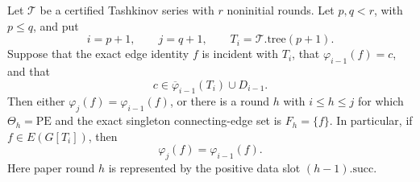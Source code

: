 \begin{lemma}
Let \(\mathcal T\) be a certified Tashkinov series with \(r\)
noninitial rounds.  Let \(p,q<r\), with \(p\leq q\), and put
\[
 i=p+1,\qquad j=q+1,\qquad T_i=\mathcal T.\mathrm{tree}(p+1).
\]
Suppose that the exact edge identity \(f\) is incident with \(T_i\),
that \(\varphi_{i-1}(f)=c\), and that
\[
 c\in\overline\varphi_{i-1}(T_i)\cup D_{i-1}.
\]
Then either \(\varphi_j(f)=\varphi_{i-1}(f)\), or there is a round
\(h\) with \(i\leq h\leq j\) for which
\(\Theta_h=\mathrm{PE}\) and the exact singleton connecting-edge set is
\(F_h=\{f\}\).  In particular, if
\(f\in E(G[T_i])\), then
\[
 \varphi_j(f)=\varphi_{i-1}(f).
\]
Here paper round \(h\) is represented by the positive data slot
\((h-1).\mathrm{succ}\).
\end{lemma}
